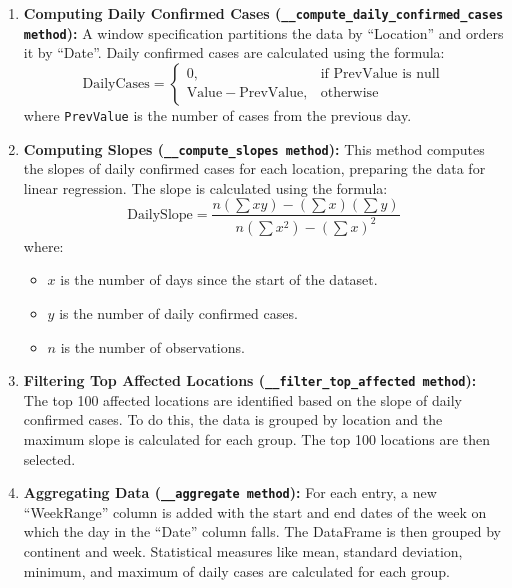 \documentclass[12pt,oneside]{book} %
\begin{document}
\begin{enumerate}
    \item \textbf{Computing Daily Confirmed Cases (\texttt{\_\_compute\_daily\_confirmed\_cases method}):} A window specification partitions the data by ``Location'' and orders it by ``Date''. Daily confirmed cases are calculated using the formula:
          \begin{equation}
              \text{DailyCases} =
              \begin{cases}
                  \text{0},                        & \text{if } \text{PrevValue is null} \\
                  \text{Value} - \text{PrevValue}, & \text{otherwise}
              \end{cases}
          \end{equation}
          where \texttt{PrevValue} is the number of cases from the previous day.

    \item \textbf{Computing Slopes (\texttt{\_\_compute\_slopes method}):} This method computes the slopes of daily confirmed cases for each location, preparing the data for linear regression. The slope is calculated using the formula:
          \begin{equation}
              \text{DailySlope} = \frac{n(\sum xy) - (\sum x)(\sum y)}{n(\sum x^2) - {(\sum x)}^2}
          \end{equation}
          where:
          \begin{itemize}
              \item $x$ is the number of days since the start of the dataset.
              \item $y$ is the number of daily confirmed cases.
              \item $n$ is the number of observations.
          \end{itemize}

    \item \textbf{Filtering Top Affected Locations (\texttt{\_\_filter\_top\_affected method}):} The top 100 affected locations are identified based on the slope of daily confirmed cases. To do this, the data is grouped by location and the maximum slope is calculated for each group. The top 100 locations are then selected.

    \item \textbf{Aggregating Data (\texttt{\_\_aggregate method}):} For each entry, a new ``WeekRange'' column is added with the start and end dates of the week on which the day in the ``Date'' column falls. The DataFrame is then grouped by continent and week. Statistical measures like mean, standard deviation, minimum, and maximum of daily cases are calculated for each group.
\end{enumerate}
\end{document}
